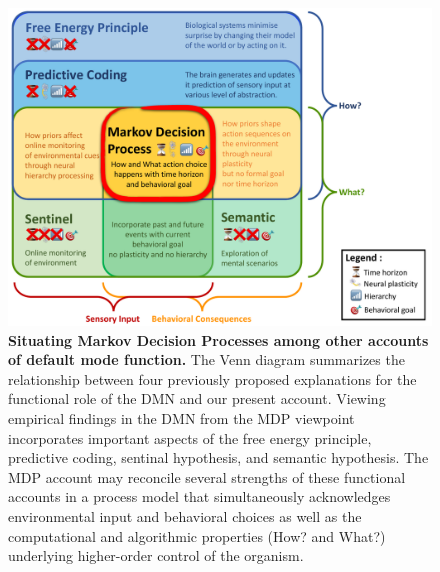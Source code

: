 \documentclass[10pt,letterpaper]{article}
\begin{document}





\begin{figure}[!h]
  \includegraphics[width=1\linewidth]{VennDiagram-2018-08-11.pdf}
  \caption{\textbf{Situating Markov Decision Processes among other accounts of default mode function.}
  The Venn diagram summarizes the relationship between four previously proposed explanations for the functional role of the DMN and our present account. Viewing empirical findings in the DMN from the MDP viewpoint incorporates important aspects of the free energy principle, predictive coding, sentinal hypothesis, and semantic hypothesis.
  The MDP account may reconcile several strengths of these functional accounts in a process model that simultaneously acknowledges environmental input and behavioral choices as well as the computational and algorithmic properties (How? and What?) underlying higher-order control of the organism.}
  \label{fig:VennDiagram}
\end{figure}
\end{document}
